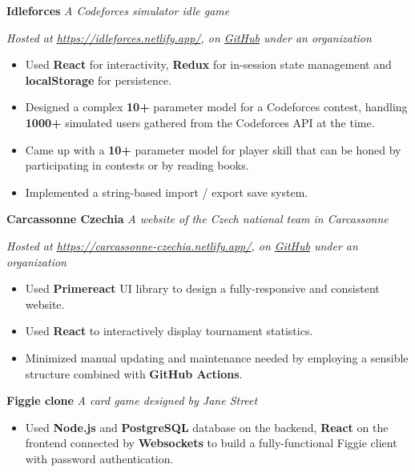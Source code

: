 \ifczech

\else

\textbf{Idleforces} \hfill \textit{A Codeforces simulator idle game} \par
\textit{Hosted at \href{https://idleforces.netlify.app/}{https://idleforces.netlify.app/}, on \href{https://github.com/Idleforces/idleforces}{GitHub} under an organization}
\begin{itemize}
    \item Used \textbf{React} for interactivity, \textbf{Redux} for in-session state management and \textbf{localStorage} for persistence.
    \item Designed a complex \textbf{10+} parameter model for a Codeforces contest, handling \textbf{1000+} simulated users gathered from the Codeforces API at the time.
    \item Came up with a \textbf{10+} parameter model for player skill that can be honed by participating in contests or by reading books.
    \item Implemented a string-based import / export save system.
\end{itemize}

\vspace{5pt}

\textbf{Carcassonne Czechia} \hfill \textit{A website of the Czech national team in Carcassonne} \par
\textit{Hosted at \href{https://carcassonne-czechia.netlify.app/}{https://carcassonne-czechia.netlify.app/}, on \href{https://github.com/Carcassonne-Czechia/carcassonne-czechia}{GitHub} under an organization}
\begin{itemize}
    \item Used \textbf{Primereact} UI library to design a fully-responsive and consistent website.
    \item Used \textbf{React} to interactively display tournament statistics.
    \item Minimized manual updating and maintenance needed by employing a sensible structure combined with \textbf{GitHub Actions}.
\end{itemize}

\vspace{5pt}

\textbf{Figgie clone} \hfill \textit{A card game designed by Jane Street} \par
\begin{itemize}
    \item Used \textbf{Node.js} and \textbf{PostgreSQL} database on the backend, \textbf{React} on the frontend connected by \textbf{Websockets} to build a fully-functional Figgie client with password authentication.
\end{itemize}
\fi